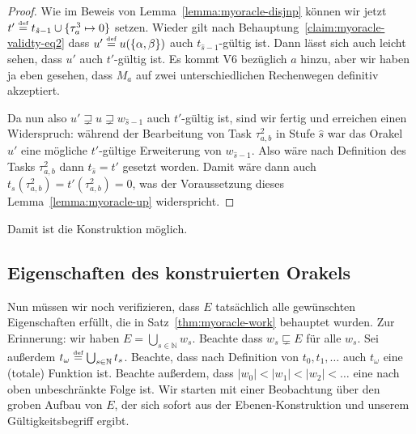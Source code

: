 \begin{proof}
Wie im Beweis von Lemma~\ref{lemma:myoracle-disjnp} können wir jetzt $t'\stackrel{\text{{\normalfont\tiny def}}}{=} t_{\hat{s}-1}\cup\{\tau^3_{a} \mapsto 0\}$ setzen.
Wieder gilt nach Behauptung~\ref{claim:myoracle-validty-eq2} dass $u'\stackrel{\text{{\normalfont\tiny def}}}{=} u(\{\alpha, \beta\})$ auch $t_{\hat{s}-1}$-gültig ist.
Dann lässt sich auch leicht sehen, dass $u'$ auch $t'$-gültig ist. Es kommt V6 bezüglich $a$ hinzu, aber wir haben ja eben gesehen, dass $M_a$ auf zwei unterschiedlichen Rechenwegen definitiv akzeptiert.

Da nun also $u'\sqsupsetneq u \sqsupsetneq w_{\hat{s}-1}$ auch $t'$-gültig ist, sind wir fertig und erreichen einen Widerspruch: während der Bearbeitung von Task $\tau^2_{a,b}$ in Stufe $\hat{s}$ war das Orakel $u'$ eine mögliche $t'$-gültige Erweiterung von $w_{\hat{s}-1}$. Also wäre nach Definition des Tasks $\tau^2_{a,b}$ dann $t_{\hat{s}}=t'$ gesetzt worden.
Damit wäre dann auch $t_{s}(\tau^2_{a,b})=t'(\tau^2_{a,b})=0$, was der Voraussetzung dieses Lemma~\ref{lemma:myoracle-up} widerspricht.
\end{proof}

Damit ist die Konstruktion möglich. 

\subsection*{Eigenschaften des konstruierten Orakels}

Nun müssen wir noch verifizieren, dass $E$ tatsächlich alle gewünschten Eigenschaften erfüllt, die in Satz~\ref{thm:myoracle-work} behauptet wurden.
Zur Erinnerung: wir haben $E=\bigcup_{s\in\mathbb N} w_s$.
Beachte dass $w_s\sqsubsetneq E$ für alle $w_s$.
Sei außerdem $t_\omega \stackrel{\text{{\normalfont\tiny def}}}{=} \bigcup_{s\in\mathbb N} t_s$. Beachte, dass nach Definition von $t_0, t_1, \dots$ auch $t_\omega$ eine (totale) Funktion ist.
Beachte außerdem, dass $|w_0|<|w_1|< |w_2|< \ldots$ eine nach oben unbeschränkte Folge ist.
Wir starten mit einer Beobachtung über den groben Aufbau von $E$, der sich sofort aus der Ebenen-Konstruktion und unserem Gültigkeitsbegriff ergibt.

